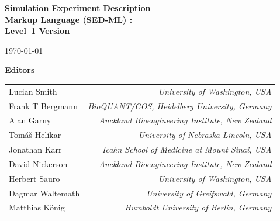 
\begin{titlepage}


\begin{center}

  \textbf{\sffamily\bfseries\huge
    Simulation Experiment Description\\ Markup Language (SED-ML) :\\[0.3em]
    Level~1 Version~}

\vspace*{0.5in}

\large
\today\\[0.25in]


\vspace{0.5in}

\textbf{\sffamily Editors}\\[7pt]
\begin{tabular}{l>{\hspace*{15pt}}r}
Lucian Smith & \emph{University of Washington, USA}\\
Frank T Bergmann & \emph{BioQUANT/COS, Heidelberg University, Germany}\\
Alan Garny & \emph{Auckland Bioengineering Institute, New Zealand}\\
Tom\'{a}\v{s} Helikar & \emph{University of Nebraska-Lincoln, USA}\\
Jonathan Karr & \emph{Icahn School of Medicine at Mount Sinai, USA}\\
David Nickerson & \emph{Auckland Bioengineering Institute, New Zealand}\\
Herbert Sauro & \emph{University of Washington, USA}\\
Dagmar Waltemath & \emph{University of Greifswald, Germany}\\
Matthias K\"{o}nig & \emph{Humboldt University of Berlin, Germany}\\
\end{tabular}
 

\end{center}
\end{titlepage}
